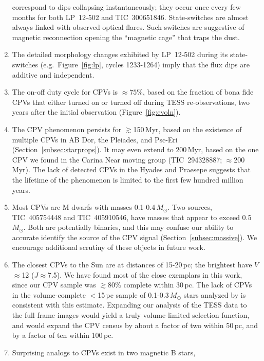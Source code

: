 \documentclass[11pt,twocolumn,tighten,linenumbers]{aastex63}
\begin{document}
\begin{enumerate}[leftmargin=*]
      correspond to dips collapsing instantaneously;  they occur once
      every few months for both LP~12-502 and TIC~300651846.
      State-switches are almost always linked with observed optical
      flares.  Such switches are suggestive of magnetic reconnection
      opening the ``magnetic cage'' that traps the dust.
%
    \item The detailed morphology changes exhibited by LP~12-502
      during its state-switches (e.g.\ Figure~\ref{fig:lp}, cycles
      1233-1264) imply that the flux dips are additive and
      independent.
%
    \item The on-off duty cycle for CPVs is $\approx$$75$\%, based
      on the fraction of bona fide CPVs that either turned on or turned
      off during TESS re-observations, two years after the initial
      observation (Figure~\ref{fig:evoln}).
%
    \item The CPV phenomenon persists for $\gtrsim$150\,Myr, based on
      the existence of multiple CPVs in AB Dor, the Pleiades, and
      Psc-Eri (Section~\ref{subsec:starprops}).  It may even extend to
      200\,Myr, based on the one CPV we found in the Carina Near
      moving group (TIC~294328887; $\approx$200\,Myr).  The lack of
      detected CPVs in the Hyades and Praesepe suggests that the
      lifetime of the phenomenon is limited to the first few hundred
      million years.
%
    \item Most CPVs are M dwarfs with masses 0.1-0.4\,$M_\odot$.  Two
      sources, TIC~405754448 and TIC~405910546, have masses that
      appear to exceed 0.5\,$M_\odot$.  Both are potentially binaries,
      and this may confuse our ability to accurate identify the source
      of the CPV signal (Section~\ref{subsec:massive}).  We encourage
      additional scrutiny of these objects in future work.
%
    \item The closest CPVs to the Sun are at distances of 15-20\,pc;
      the brightest have $V$$\approx$12 ($J$$\approx$7.5).  We have
      found most of the close exemplars in this work, since our CPV
      sample was $\gtrsim$80\% complete within 30\,pc.  The lack of
      CPVs in the volume-complete $<$15\,pc sample of
      0.1-0.3\,$M_\odot$ stars analyzed by \citet{2021AJ....161...63W}
      is consistent with this estimate.  Expanding our analysis of the
      TESS data to the full frame images would yield a truly
      volume-limited selection function, and would expand the CPV
      census by about a factor of two within 50\,pc, and by a factor
      of ten within 100\,pc.
%
    \item Surprising analogs to CPVs exist in two magnetic B stars,
$$
\end{enumerate}
\end{document}

